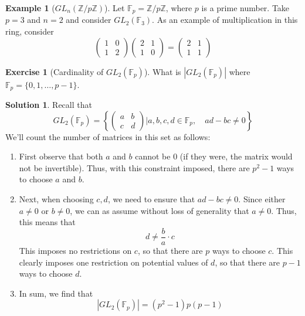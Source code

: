\documentclass[12pt]{article}
\theoremstyle{definition}
\newcommand{\Z}{\mathbb{Z}}
\newtheorem{example}{\color{WildStrawberry}Example}
\newtheorem{exercise}{\color{YellowOrange}Exercise}
\theoremstyle{definition}
\newtheorem{solution}{\color{Goldenrod}Solution}
\begin{document}
\begin{example}[$GL_n(\Z / p\Z)$]
	Let $\mathbb{F}_p = \Z / p\Z $, where $p$ is a prime number. Take $p=3$ and $n=2$ and consider $GL_2(\mathbb{F}_3)$. As an example of multiplication in this ring, consider
	\begin{equation}
		\begin{pmatrix}
		1 & 0 \\
		1 & 2
		\end{pmatrix}
		\begin{pmatrix}
		2 & 1 \\
		1 & 0
		\end{pmatrix}
		=
		\begin{pmatrix}
		2 & 1 \\
		1 & 1
		\end{pmatrix}
	\end{equation}
\end{example}

\begin{exercise}[Cardinality of $GL_2(\mathbb{F}_p)$]
	What is $|GL_2(\mathbb{F}_p)|$ where $\mathbb{F}_p = \{0,1,\ldots,p-1\}$.
\end{exercise}
\begin{solution}
	Recall that 
	\begin{equation}
		GL_2(\mathbb{F}_p) = \left\{
		\begin{pmatrix}
		a & b \\
		c & d
		\end{pmatrix}
		\bigg\vert
		a,b,c,d \in \mathbb{F}_p, \quad ad-bc \neq 0
		\right\}
	\end{equation}
	We'll count the number of matrices in this set as follows:
	\begin{enumerate}
		\item First observe that both $a$ and $b$ cannot be 0 (if they were, the matrix would not be invertible). Thus, with this constraint imposed, there are $p^2 -1$ ways to choose $a$ and $b$. 
		\item Next, when choosing $c,d$, we need to ensure that $ad - bc \neq 0$. Since either $a \neq 0$ or $b \neq 0$, we can as assume without loss of generality that $a \neq 0$. Thus, this means that 
		\begin{equation}
			d \neq \frac{b}{a} \cdot c
		\end{equation}
		This imposes no restrictions on $c$, so that there are $p$ ways to choose $c$. This clearly imposes one restriction on potential values of $d$, so that there are $p-1$ ways to choose $d$. 
		\item In sum, we find that
		\begin{equation}
			|GL_2(\mathbb{F}_p)| = (p^2 - 1)p(p-1)
		\end{equation}
	\end{enumerate}
\end{solution}
\end{document}
